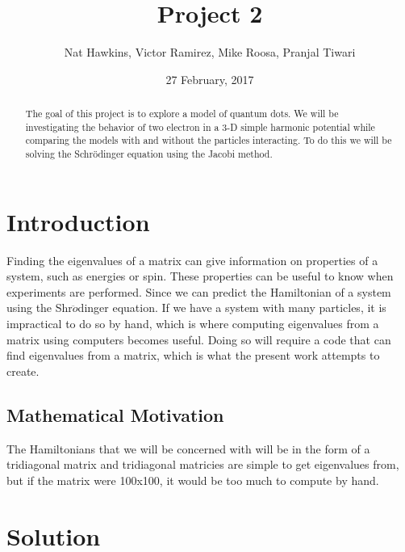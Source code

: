 \documentclass{article}
\title{Project 2}
\author{Nat Hawkins, Victor Ramirez, Mike Roosa, Pranjal Tiwari}
\date{27 February, 2017}
\begin{document}
\maketitle

\begin{abstract}
	The goal of this project is to explore a model of quantum dots. We will be investigating the behavior of two electron in a 3-D simple harmonic potential while comparing the models with and without the particles interacting. To do this we will be solving the Schrödinger equation using the Jacobi method. 
\end{abstract}

\section{Introduction}
Finding the eigenvalues of a matrix can give information on properties of a system, such as energies or spin. These properties can be useful to know when experiments are performed. Since we can predict the Hamiltonian of a system using the Shr$\ddot{o}$dinger equation. If we have a system with many particles, it is impractical to do so by hand, which is where computing eigenvalues from a matrix using computers becomes useful. Doing so will require a code that can find eigenvalues from a matrix, which is what the present work attempts to create.

\subsection{Mathematical Motivation}
The Hamiltonians that we will be concerned with will be in the form of a tridiagonal matrix and tridiagonal matricies are simple to get eigenvalues from, but if the matrix were 100x100, it would be too much to compute by hand.

\section{Solution}
\end{document}
